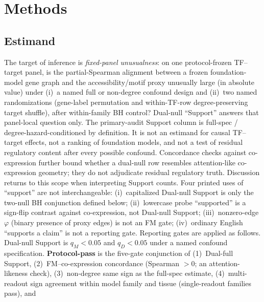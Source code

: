 \documentclass[fleqn,10pt,lineno]{wlpeerj}
\begin{document}
\begin{table}[H]\centering

\caption{Protocol axes versus related evaluation resources. Entries are qualitative design
features, not performance ranks. scReg-Eval is a fixed-panel audit capsule; GeneRNIB and BioLLM-style
suites score broader tasks against often expression-linked references.}\label{tab:related}
\end{table}

\section{Methods}
\subsection{Estimand}\label{sec:estimand}
The target of inference is \emph{fixed-panel unusualness}: on one protocol-frozen TF--target panel,
is the partial-Spearman alignment between a frozen foundation-model gene graph and the
accessibility/motif proxy unusually large (in absolute value) under (i)~a named full or non-degree
confound design and (ii)~two named randomizations (gene-label permutation and within-TF-row
degree-preserving target shuffle), after within-family BH control? Dual-null ``Support'' answers
that panel-local question only. The primary-audit Support column is full-spec /
degree-hazard-conditioned by definition. It is not an estimand for causal TF--target effects, not a ranking
of foundation models, and not a test of residual regulatory content after every possible
confound. Concordance checks against co-expression further bound whether a dual-null row resembles
attention-like co-expression geometry; they do not adjudicate residual regulatory truth. Discussion
returns to this scope when interpreting Support counts.
Four printed uses of ``support'' are not interchangeable: (i)~capitalized Dual-null Support is only
the two-null BH conjunction defined below; (ii)~lowercase probe ``supported'' is a sign-flip contrast
against co-expression, not Dual-null Support; (iii)~nonzero-edge $\varphi$ (binary presence of
proxy edges) is not an FM gate; (iv)~ordinary English ``supports a claim'' is not a reporting gate.
Reporting gates are applied as follows. Dual-null Support is
$q_M<0.05$ and $q_D<0.05$ under a named confound specification.
\textbf{Protocol-pass} is the five-gate conjunction of (1)~Dual-full Support,
(2)~FM--co-expression concordance (Spearman $>0$; an attention-likeness check),
(3)~non-degree same sign as the full-spec estimate,
(4)~multi-readout sign agreement within model family and tissue (single-readout families pass), and
\end{document}
